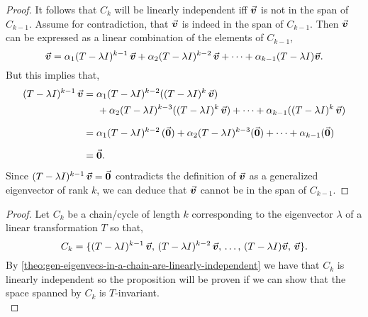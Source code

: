 \documentclass[../MathsNotesBase.tex]{subfiles}
\begin{document}
{\begin{proof}
			It follows that $C_k$ will be linearly independent iff $\vec{\bm{v}}$ is not in the span of $C_{k-1}$. Assume for contradiction, that $\vec{\bm{v}}$ is indeed in the span of $C_{k-1}$. Then $\vec{\bm{v}}$ can be expressed as a linear combination of the elements of $C_{k-1}$,
			\[ \vec{\bm{v}} = \alpha_1 (T - \lambda I)^{k-1} \, \vec{\bm{v}} + \alpha_2 (T - \lambda I)^{k-2} \, \vec{\bm{v}} + \cdots + \alpha_{k-1} (T - \lambda I) \vec{\bm{v}}. \]
			But this implies that,
			\[\begin{aligned}
				(T - \lambda I)^{k-1} \, \v &= \alpha_1 (T - \lambda I)^{k-2} ((T - \lambda I)^k \, \v) \\
				&\hspace{14pt} + \alpha_2 (T - \lambda I)^{k-3} ((T - \lambda I)^k \, \v) + \cdots + \alpha_{k-1} ((T - \lambda I)^k \, \v) \nn
				&= \alpha_1 (T - \lambda I)^{k-2} \, (\0) + \alpha_2 (T - \lambda I)^{k-3} (\0) + \cdots + \alpha_{k-1} (\0) \nn
				&= \0.
			\end{aligned}\]
			Since ${ (T - \lambda I)^{k-1} \, \vec{\bm{v}} = \vec{\bm{0}} }$ contradicts the definition of $\vec{\bm{v}}$ as a generalized eigenvector of rank $k$, we can deduce that $\vec{\bm{v}}$ cannot be in the span of $C_{k-1}$.
		\end{proof}
	
		\bigskip
		\begin{proof}
			Let $C_k$ be a chain/cycle of length $k$ corresponding to the eigenvector $\lambda$ of a linear transformation $T$ so that,
			\[ C_k = \{ (T - \lambda I)^{k-1} \, \vec{\bm{v}}, \, (T - \lambda I)^{k-2} \, \vec{\bm{v}}, \, \dots, \, (T - \lambda I) \vec{\bm{v}}, \, \vec{\bm{v}} \}. \]
			By \autoref{theo:gen-eigenvecs-in-a-chain-are-linearly-independent} we have that $C_k$ is linearly independent so the proposition will be proven if we can show that the space spanned by $C_k$ is $T$-invariant.\\
			
			

\end{proof}}
\end{document}
